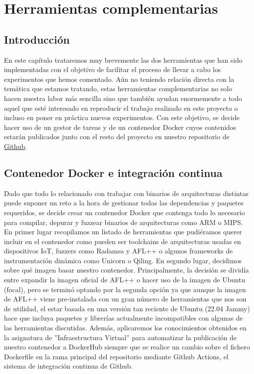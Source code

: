 \chapter{Herramientas complementarias}
\label{herramientas}
\section{Introducción}
En este capítulo trataremos muy brevemente las dos herramientas que han sido implementadas con el objetivo de facilitar el proceso de llevar a cabo los 
experimentos que hemos comentado. Aún no teniendo relación directa con la temática que estamos tratando, estas herramientas complementarias no solo 
hacen nuestra labor más sencilla sino que también ayudan enormemente a todo aquel que esté interesado en reproducir el trabajo realizado en este proyecto
o incluso en poner en práctica nuevos experimentos. Con este objetivo, se decide hacer uso de un gestor de tareas y de un contenedor Docker cuyos contenidos estarán
publicados junto con el resto del proyecto en nuestro repositorio de \href{https://github.com/Olasergiolas/TFG}{Github}.

\section{Contenedor Docker e integración continua}
Dado que todo lo relacionado con trabajar con binarios de arquitecturas distintas puede suponer un reto a la hora de gestionar todas las dependencias
y paquetes requeridos, se decide crear un contenedor Docker que contenga todo lo necesario para compilar, depurar y fuzzear binarios de arquitecturas como 
ARM o MIPS. En primer lugar recopilamos un listado de herramientas que pudiéramos querer incluir en el contenedor como pueden ser toolchains de arquitecturas
usadas en dispositivos IoT, 
fuzzers como Radamsa y AFL++ o algunos frameworks de instrumentación dinámica como Unicorn o Qiling. En segundo lugar, decidimos sobre qué
imagen basar nuestro contenedor. Principalmente, la decisión se dividía entre expandir la imagen oficial de AFL++ o hacer uso de la imagen de Ubuntu (focal), pero se 
terminó optando por la segunda opción ya que aunque la imagen de AFL++ viene pre-instalada con un gran número de herramientas que nos son de utilidad, el 
estar basada en una versión tan reciente de Ubuntu (22.04 Jammy) hace que incluya paquetes y librerías actualmente incompatibles con algunas de las 
herramientas discutidas. Además, aplicaremos los conocimientos obtenidos en la asignatura de ''Infraestructura Virtual'' para automatizar la publicación de nuestro
contenedor a DockerHub siempre que se realice un cambio sobre el fichero Dockerfile en la rama principal del repositorio mediante Github Actions,
el sistema de integración continua de Github.

